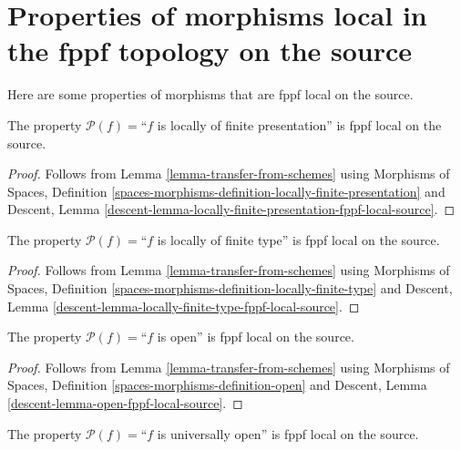 \section{Properties of morphisms local in the fppf topology on the source}
\label{section-fppf-local-source}

\noindent
Here are some properties of morphisms that are fppf local on the source.

\begin{lemma}
\label{lemma-locally-finite-presentation-fppf-local-source}
The property $\mathcal{P}(f)=$``$f$ is locally of finite presentation''
is fppf local on the source.
\end{lemma}

\begin{proof}
Follows from
Lemma \ref{lemma-transfer-from-schemes}
using
Morphisms of Spaces,
Definition \ref{spaces-morphisms-definition-locally-finite-presentation}
and
Descent,
Lemma \ref{descent-lemma-locally-finite-presentation-fppf-local-source}.
\end{proof}

\begin{lemma}
\label{lemma-locally-finite-type-fppf-local-source}
The property $\mathcal{P}(f)=$``$f$ is locally of finite type''
is fppf local on the source.
\end{lemma}

\begin{proof}
Follows from
Lemma \ref{lemma-transfer-from-schemes}
using
Morphisms of Spaces,
Definition \ref{spaces-morphisms-definition-locally-finite-type}
and
Descent, Lemma \ref{descent-lemma-locally-finite-type-fppf-local-source}.
\end{proof}

\begin{lemma}
\label{lemma-open-fppf-local-source}
The property $\mathcal{P}(f)=$``$f$ is open''
is fppf local on the source.
\end{lemma}

\begin{proof}
Follows from
Lemma \ref{lemma-transfer-from-schemes}
using
Morphisms of Spaces, Definition \ref{spaces-morphisms-definition-open}
and
Descent, Lemma \ref{descent-lemma-open-fppf-local-source}.
\end{proof}

\begin{lemma}
\label{lemma-universally-open-fppf-local-source}
The property $\mathcal{P}(f)=$``$f$ is universally open''
is fppf local on the source.
\end{lemma}

